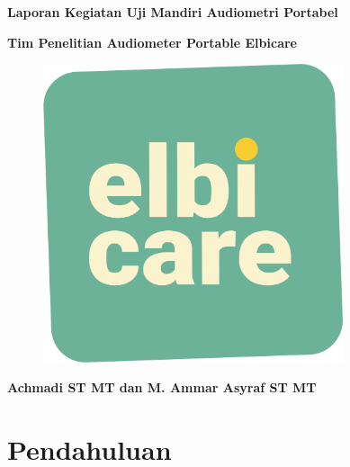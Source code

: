 \documentclass{article}
\def\mydate{\leavevmode\hbox{\the\year-\twodigits\month-\twodigits\day}}
\def\twodigits#1{\ifnum#1<10 0\fi\the#1}
\newcommand{\ShowOsVersion}{
	\immediate\write18{\unexpanded{foo=`uname -srom | tr '_' '-'` && echo -n "${foo}" > tmp.txt}}
	\unskip\unskip\unskip
	\immediate\write18{rm tmp.txt}
}
\newcommand{\ShowTexVersion}{
	\immediate\write18{\unexpanded{foo=`pdflatex -version | head -n1 | cut -d' ' -f1,2` && echo -n "${foo}" > tmp.txt}}
	\unskip\unskip\unskip
	\immediate\write18{rm tmp.txt}
}
\begin{document}
	\begin{titlepage}
		\centering

		{
			\LARGE
			\bf
			Laporan Kegiatan Uji Mandiri Audiometri Portabel
		}

		\bigskip

		{
			\large
			\bf
			Tim Penelitian Audiometer Portable Elbicare
		}

		\vfill

		\begin{figure}[H]
			\centering
			\includegraphics[width=250pt,angle=0]{images/elbicare-logo}
		\end{figure}

		\vfill

		\bigskip

		{
			\bf
			Achmadi ST MT dan M. Ammar Asyraf ST MT
		}
	\end{titlepage}

%
%
%

	\newpage

	\tableofcontents

	\newpage
	\section{Pendahuluan}
\end{document}
